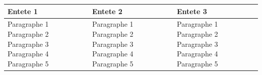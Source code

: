 \documentclass[11pt,a4paper]{article}
\begin{document}
\begin{table}[h]
\begin{tabular}{|l|l|l|}
\hline
Entete 1 & Entete 2 & Entete 3 \\ \hline
Paragraphe 1  Paragraphe 2  Paragraphe 3  Paragraphe 4  Paragraphe 5 & Paragraphe 1  Paragraphe 2  Paragraphe 3  Paragraphe 4  Paragraphe 5 & Paragraphe 1  Paragraphe 2  Paragraphe 3  Paragraphe 4  Paragraphe 5 \\ \hline
\end{tabular}
\end{table}
\end{document}
